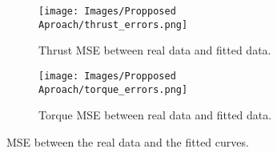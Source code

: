 \begin{figure}[H]
    \begin{subfigure}{0.5\textwidth} 
        \centering
        \texttt{[image: Images/Propposed Aproach/thrust\_errors.png]}
        \caption{Thrust MSE between real data and fitted data.}
        \label{fig:Proposed Approach: Simulation: Thrust Errors}
    \end{subfigure} 
    \hfill
    \begin{subfigure}{0.5\textwidth}
        \centering
        \texttt{[image: Images/Propposed Aproach/torque\_errors.png]}
        \caption{Torque MSE between real data and fitted data.}
        \label{fig:Proposed Approach: Simulation: Torque Errors}
    \end{subfigure}
    \caption{MSE between the real data and the fitted curves.}
    \label{fig:Proposed Approach: Simulation: Fitting Errors}
\end{figure}
